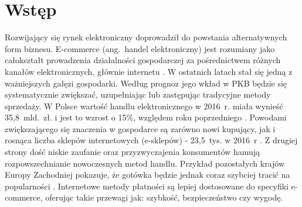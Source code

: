 \section*{Wstęp}

Rozwijający się rynek elektroniczny doprowadził do powstania alternatywnych form biznesu. E-commerce (ang.~handel elektroniczny) \cite{biblia_ebiznesu} jest rozumiany jako całokształt prowadzenia działalności gospodarczej za pośrednictwem różnych kanałów elektronicznych, głównie internetu \cite{pieniadz_elektroniczny-analiza}. W ostatnich latach stał się jedną z ważniejszych gałęzi gospodarki. Według prognoz jego wkład w PKB będzie się systematycznie zwiększać, uzupełniając lub zastępując tradycyjne metody sprzedaży. W Polsce wartość handlu elektronicznego w 2016~r. miała wynieść 35,8~mld.~zł. i jest to wzrost o 15\%, względem roku poprzedniego \cite{barometr_radio}. Powodami zwiększającego się znaczenia w gospodarce są zarówno nowi kupujący, jak i rosnąca liczba sklepów internetowych (e-sklepów) - 23,5~tys. w 2016~r \cite{barometr_radio}. Z drugiej strony dość niskie zaufanie oraz przyzwyczajenia konsumentów hamują rozpowszechnianie nowoczesnych metod handlu. Przykład pozostałych krajów Europy Zachodniej pokazuje, że gotówka będzie jednak coraz szybciej tracić na popularności \cite{pieniadz_elektroniczny-analiza}. Internetowe metody płatności są lepiej dostosowane do specyfiki e-commerce, oferując takie przewagi jak: szybkość, bezpieczeństwo czy wygodę.

